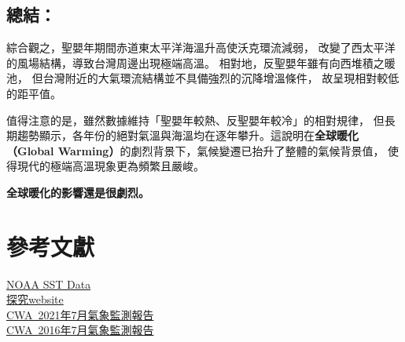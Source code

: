 \documentclass[UTF8, fontset=none,12pt]{ctexart}
\begin{document}
\subsection*{總結：}
綜合觀之，聖嬰年期間赤道東太平洋海溫升高使沃克環流減弱，
改變了西太平洋的風場結構，導致台灣周邊出現極端高溫。
相對地，反聖嬰年雖有向西堆積之暖池，
但台灣附近的大氣環流結構並不具備強烈的沉降增溫條件，
故呈現相對較低的距平值。

值得注意的是，雖然數據維持「聖嬰年較熱、反聖嬰年較冷」的相對規律，
但長期趨勢顯示，各年份的絕對氣溫與海溫均在逐年攀升。這說明在{\bfseries 全球暖化
（Global Warming）}的劇烈背景下，氣候變遷已抬升了整體的氣候背景值，
使得現代的極端高溫現象更為頻繁且嚴峻。

{\bfseries \noindent\fontsize{14}{19}\selectfont
全球暖化的影響還是很劇烈。
}
\newpage
{
\section{參考文獻}
\href{https://coastwatch.pfeg.noaa.gov}{NOAA SST Data}\\
\href{https://weilinlai719.github.io/earth-science-explore/}{探究website}\\
\href{https://www.cwa.gov.tw/Data/climate/Watch/twn/twn-monitor_2021-6.pdf}{CWA\ 2021年7月氣象監測報告}\\
\href{https://www.cwa.gov.tw/Data/climate/Watch/twn/twn-monitor_2016-6.pdf}{CWA\ 2016年7月氣象監測報告}
}
\end{document}
